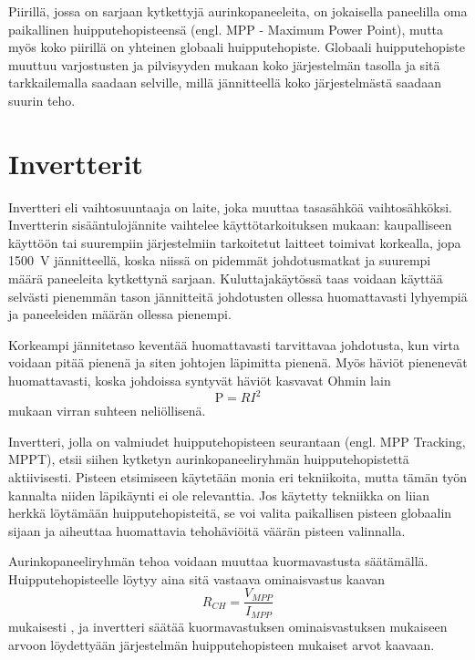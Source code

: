   Piirillä, jossa on sarjaan kytkettyjä aurinkopaneeleita, on jokaisella paneelilla oma paikallinen huipputehopisteensä (engl. MPP - Maximum Power Point), mutta myös koko piirillä on yhteinen globaali huipputehopiste. Globaali huipputehopiste muuttuu varjostusten ja pilvisyyden mukaan koko järjestelmän tasolla ja sitä tarkkailemalla saadaan selville, millä jännitteellä koko järjestelmästä saadaan suurin teho.

\section{Invertterit}
  Invertteri eli vaihtosuuntaaja on laite, joka muuttaa tasasähköä vaihtosähköksi. Invertterin sisääntulojännite vaihtelee käyttötarkoituksen mukaan: kaupalliseen käyttöön tai suurempiin järjestelmiin tarkoitetut laitteet toimivat korkealla, jopa \SI{1500}{\volt} jännitteellä, koska niissä on pidemmät johdotusmatkat ja suurempi määrä paneeleita kytkettynä sarjaan. Kuluttajakäytössä taas voidaan käyttää selvästi pienemmän tason jännitteitä johdotusten ollessa huomattavasti lyhyempiä ja paneeleiden määrän ollessa pienempi.

  Korkeampi jännitetaso keventää huomattavasti tarvittavaa johdotusta, kun virta voidaan pitää pienenä ja siten johtojen läpimitta pienenä. Myös häviöt pienenevät huomattavasti, koska johdoissa syntyvät häviöt kasvavat Ohmin lain
  \begin{equation}
    \textrm{P} = RI^2
  \end{equation}
  mukaan virran suhteen neliöllisenä.

  Invertteri, jolla on valmiudet huipputehopisteen seurantaan (engl. MPP Tracking, MPPT), etsii siihen kytketyn aurinkopaneeliryhmän huipputehopistettä aktiivisesti. Pisteen etsimiseen käytetään monia eri tekniikoita, mutta tämän työn kannalta niiden läpikäynti ei ole relevanttia. Jos käytetty tekniikka on liian herkkä löytämään huipputehopisteitä, se voi valita paikallisen pisteen globaalin sijaan ja aiheuttaa huomattavia tehohäviöitä väärän pisteen valinnalla. \parencite{Joshi&Arora}

  Aurinkopaneeliryhmän tehoa voidaan muuttaa kuormavastusta säätämällä. Huipputehopisteelle löytyy aina sitä vastaava ominaisvastus kaavan
  \begin{equation}
    R_{CH} = \frac{V_{MPP}}{I_{MPP}}
  \end{equation}
  mukaisesti \parencite{Joshi&Arora}, ja invertteri säätää kuormavastuksen ominaisvastuksen mukaiseen arvoon löydettyään järjestelmän huipputehopisteen mukaiset arvot kaavaan.

